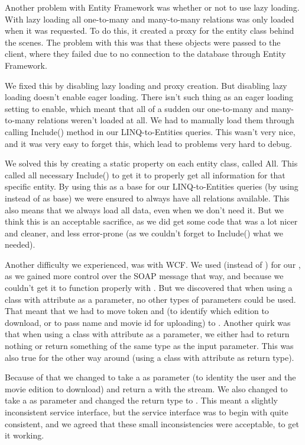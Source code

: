 Another problem with Entity Framework was whether or not to use lazy loading. With lazy loading all one-to-many and many-to-many relations was only loaded when it was requested. To do this, it created a proxy for the entity class behind the scenes. The problem with this was that these objects were passed to the client, where they failed due to no connection to the database through Entity Framework.

We fixed this by disabling lazy loading and proxy creation. But disabling lazy loading doesn't enable eager loading. There isn't such thing as an eager loading setting to enable, which meant that all of a sudden our one-to-many and many-to-many relations weren't loaded at all. We had to manually load them through calling Include() method in our LINQ-to-Entities queries. This wasn't very nice, and it was very easy to forget this, which lead to problems very hard to debug.

We solved this by creating a static property on each entity class, called All. This called all necessary Include() to get it to properly get all information for that specific entity. By using this as a base for our LINQ-to-Entities queries (by using  instead of  as base) we were ensured to always have all relations available. This also means that we always load all data, even when we don't need it. But we think this is an acceptable sacrifice, as we did get some code that was a lot nicer and cleaner, and less error-prone (as we couldn't forget to Include() what we needed).

Another difficulty we experienced, was with WCF. We used  (instead of ) for our , as we gained more control over the SOAP message that way, and because we couldn't get it to function properly with . But we discovered that when using a class with  attribute as a parameter, no other types of parameters could be used. That meant that we had to move token and  (to identify which edition to download, or to pass name and movie id for uploading) to . Another quirk was that when using a class with  attribute as a parameter, we either had to return nothing or return something of the same type as the input parameter. This was also true for the other way around (using a class with  attribute as return type).

Because of that we changed  to take a   as parameter (to identity the user and the movie edition to download) and return a   with the stream. We also changed  to take a  as parameter and changed the return type to . This meant a slightly inconsistent service interface, but the service interface was to begin with quite consistent, and we agreed that these small inconsistencies were acceptable, to get it working.